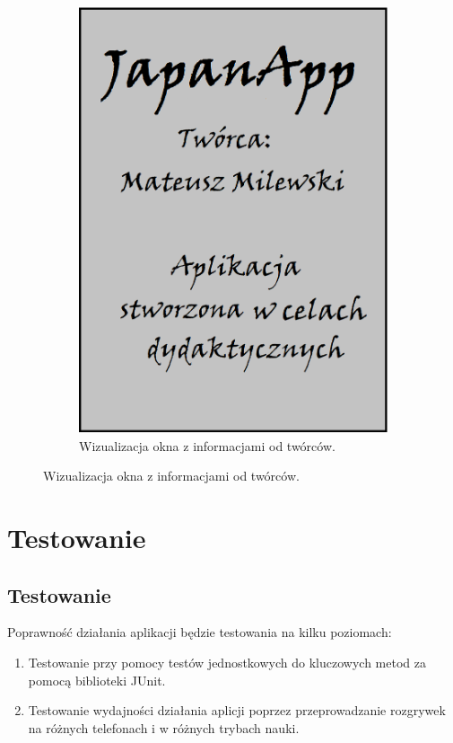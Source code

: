 \documentclass[15pt]{article}
\begin{document}
\begin{figure}[h!]
  \begin{subfigure}[b]{0.35\linewidth}
    \includegraphics[width=\linewidth]{credits.png}
    \caption{Wizualizacja okna z informacjami od twórców.}
  \end{subfigure}
  \label{fig:coffee}
\end{figure}






\newpage
\section{Testowanie}
\subsection{Testowanie}
Poprawność działania aplikacji będzie testowania na kilku poziomach:
\begin{enumerate}
  \item Testowanie przy pomocy testów jednostkowych do kluczowych metod za pomocą biblioteki JUnit.
  \item Testowanie wydajności działania aplicji poprzez przeprowadzanie rozgrywek na różnych telefonach i w różnych trybach nauki.
\end{enumerate}
\end{document}
